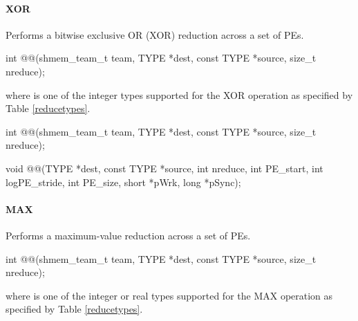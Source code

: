 \begin{apidefinition}
\paragraph{XOR}
Performs a bitwise exclusive OR (XOR) reduction across a set of \acp{PE}.\newline

{\color{Green}
\begin{C11synopsis}
int @@(shmem_team_t team, TYPE *dest, const TYPE *source, size_t nreduce);
\end{C11synopsis}
where \TYPE{} is one of the integer types supported for the XOR operation as specified by Table \ref{reducetypes}.
}

\begin{Csynopsis}
\end{Csynopsis}
{\color{Green}
\begin{CsynopsisCol}
int @@(shmem_team_t team, TYPE *dest, const TYPE *source, size_t nreduce);
\end{CsynopsisCol}
}
\begin{DeprecateBlock}
\begin{CsynopsisCol}
void @@(TYPE *dest, const TYPE *source, int nreduce, int PE_start, int logPE_stride, int PE_size, short *pWrk, long *pSync);
\end{CsynopsisCol}
\end{DeprecateBlock}

\paragraph{MAX}
Performs a maximum-value reduction across a set of \acp{PE}.\newline

{\color{Green}
\begin{C11synopsis}
int @@(shmem_team_t team, TYPE *dest, const TYPE *source, size_t nreduce);
\end{C11synopsis}
where \TYPE{} is one of the integer or real types supported for the MAX operation as specified by Table \ref{reducetypes}.
}

\begin{Csynopsis}
\end{Csynopsis}


\end{apidefinition}
